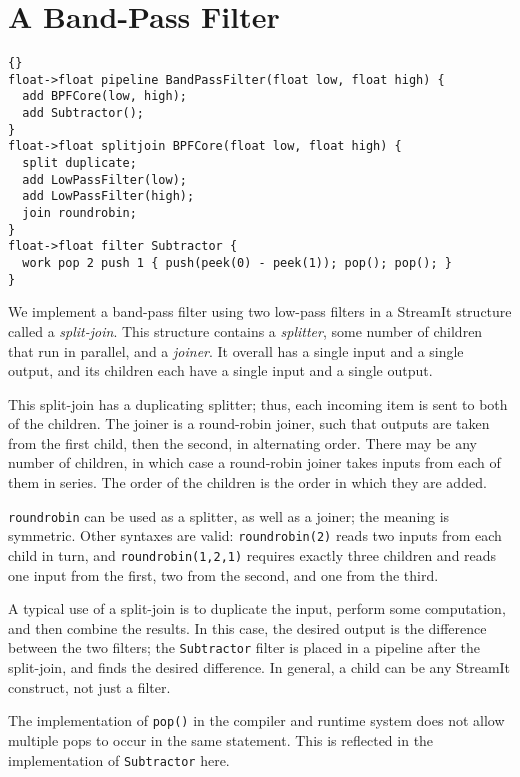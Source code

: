 \section{A Band-Pass Filter}

\begin{lstlisting}{}
float->float pipeline BandPassFilter(float low, float high) {
  add BPFCore(low, high);
  add Subtractor();
}
float->float splitjoin BPFCore(float low, float high) {
  split duplicate;
  add LowPassFilter(low);
  add LowPassFilter(high);
  join roundrobin;
}
float->float filter Subtractor {
  work pop 2 push 1 { push(peek(0) - peek(1)); pop(); pop(); }
}
\end{lstlisting}

We implement a band-pass filter using two low-pass filters in a
StreamIt structure called a \emph{split-join}.  This structure
contains a \emph{splitter}, some number of children that run in
parallel, and a \emph{joiner}.  It overall has a single input and a
single output, and its children each have a single input and a single
output.

This split-join has a duplicating splitter; thus, each incoming item
is sent to both of the children.  The joiner is a round-robin joiner,
such that outputs are taken from the first child, then the second, in
alternating order.  There may be any number of children, in which case
a round-robin joiner takes inputs from each of them in series.  The
order of the children is the order in which they are added.

\lstinline|roundrobin| can be used as a splitter, as well as a joiner;
the meaning is symmetric.  Other syntaxes are valid:
\lstinline|roundrobin(2)| reads two inputs from each child in turn,
and \lstinline|roundrobin(1,2,1)| requires exactly three children and
reads one input from the first, two from the second, and one from the
third.

A typical use of a split-join is to duplicate the input, perform some
computation, and then combine the results.  In this case, the desired
output is the difference between the two filters; the
\lstinline|Subtractor| filter is placed in a pipeline after the
split-join, and finds the desired difference.  In general, a child can
be any StreamIt construct, not just a filter.

The implementation of \lstinline|pop()| in the compiler and runtime
system does not allow multiple pops to occur in the same statement.
This is reflected in the implementation of \lstinline|Subtractor|
here.